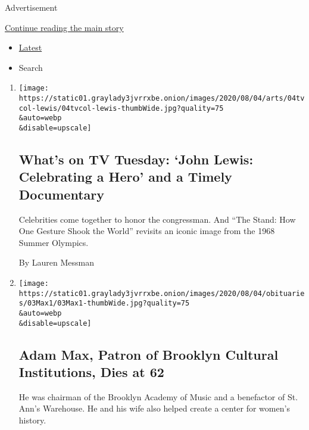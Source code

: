 Advertisement

\protect\hyperlink{after-mid1}{Continue reading the main story}

\begin{itemize}
\tightlist
\item
  \protect\hyperlink{stream-panel}{Latest}
\item
  Search
\end{itemize}

\begin{enumerate}
\def\labelenumi{\arabic{enumi}.}
\item
  \href{/2020/08/04/arts/television/whats-on-tv-tuesday.html}{}

  \texttt{[image: https://static01.graylady3jvrrxbe.onion/images/2020/08/04/arts/04tvcol-lewis/04tvcol-lewis-thumbWide.jpg?quality=75\\\&auto=webp\\\&disable=upscale]}

  \hypertarget{whats-on-tv-tuesday-john-lewis-celebrating-a-hero-and-a-timely-documentary}{%
  \subsection{What's on TV Tuesday: `John Lewis: Celebrating a Hero' and
  a Timely
  Documentary}\label{whats-on-tv-tuesday-john-lewis-celebrating-a-hero-and-a-timely-documentary}}

  Celebrities come together to honor the congressman. And ``The Stand:
  How One Gesture Shook the World'' revisits an iconic image from the
  1968 Summer Olympics.

  By Lauren Messman
\item
  \href{/2020/08/03/arts/adam-max-patron-of-brooklyn-cultural-institutions-dies-at-62.html}{}

  \texttt{[image: https://static01.graylady3jvrrxbe.onion/images/2020/08/04/obituaries/03Max1/03Max1-thumbWide.jpg?quality=75\\\&auto=webp\\\&disable=upscale]}

  \hypertarget{adam-max-patron-of-brooklyn-cultural-institutions-dies-at-62}{%
  \subsection{Adam Max, Patron of Brooklyn Cultural Institutions, Dies
  at
  62}\label{adam-max-patron-of-brooklyn-cultural-institutions-dies-at-62}}

  He was chairman of the Brooklyn Academy of Music and a benefactor of
  St. Ann's Warehouse. He and his wife also helped create a center for
  women's history.


\end{enumerate}
